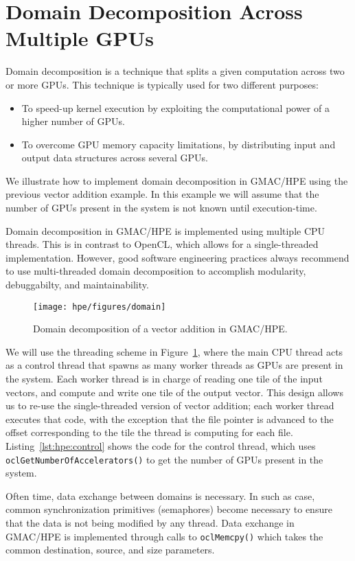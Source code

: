\section{Domain Decomposition Across Multiple GPUs}
Domain decomposition is a technique that splits a given computation across two or more GPUs. This 
technique is typically used for two different purposes:
\begin{itemize}
\item To speed\hyp{}up kernel execution by exploiting the computational power of a higher number of 
GPUs.
\item To overcome GPU memory capacity limitations, by distributing input and output data structures 
across several GPUs.
\end{itemize}

We illustrate how to implement domain decomposition in GMAC\slash HPE using the previous vector 
addition example. In this example we will assume that the number of GPUs present in the system is 
not known until execution\hyp{}time.

Domain decomposition in GMAC\slash HPE is implemented using multiple CPU threads. This is in 
contrast to OpenCL, which allows for a single\hyp{}threaded implementation. However, good software 
engineering practices always recommend to use multi\hyp{}threaded domain decomposition to accomplish 
modularity, debuggabilty, and maintainability. 

\begin{figure}
\centering
\texttt{[image: hpe/figures/domain]}
\caption{Domain decomposition of a vector addition in GMAC\slash HPE\@.}
\label{fig:hpe:domain}
\end{figure}



We will use the threading scheme in Figure~\ref{fig:hpe:domain}, where the main CPU thread acts as a 
control thread that spawns as many worker threads as GPUs are present in the system. Each worker 
thread is in charge of reading one tile of the input vectors, and compute and write one tile of the 
output vector. This design allows us to re\hyp{}use the single\hyp{}threaded version of vector 
addition; each worker thread executes that code, with the exception that the file pointer is 
advanced to the offset corresponding to the tile the thread is computing for each file.  
Listing~\ref{lst:hpe:control} shows the code for the control thread, which uses 
\texttt{ocl\-Get\-Number\-Of\-Accelerators()} to get the number of GPUs present in the system.

Often time, data exchange between domains is necessary. In such as case, common synchronization 
primitives (\eg semaphores) become necessary to ensure that the data is not being modified by any 
thread. Data exchange in GMAC\slash HPE is implemented through calls to \texttt{oclMemcpy()} which 
takes the common destination, source, and size parameters.

